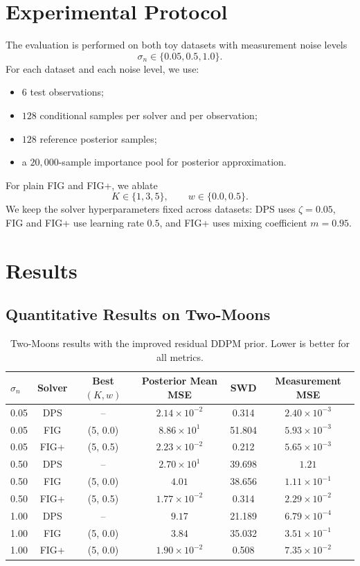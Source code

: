 \documentclass[10pt,twocolumn]{article}
\begin{document}
\section{Experimental Protocol}

The evaluation is performed on both toy datasets with measurement noise levels
\[
\sigma_n \in \{0.05, 0.5, 1.0\}.
\]
For each dataset and each noise level, we use:
\begin{itemize}[leftmargin=1.5em]
    \item \(6\) test observations;
    \item \(128\) conditional samples per solver and per observation;
    \item \(128\) reference posterior samples;
    \item a \(20{,}000\)-sample importance pool for posterior approximation.
\end{itemize}

For plain FIG and FIG+, we ablate
\[
K \in \{1,3,5\},
\qquad
w \in \{0.0, 0.5\}.
\]
We keep the solver hyperparameters fixed across datasets: DPS uses \(\zeta=0.05\), FIG and FIG+ use learning rate \(0.5\), and FIG+ uses mixing coefficient \(m=0.95\).

\section{Results}

\subsection{Quantitative Results on Two-Moons}

\begin{table}[t]
\centering
\small
\caption{Two-Moons results with the improved residual DDPM prior. Lower is better for all metrics.}
\begin{tabular}{lccccc}
\toprule
\(\sigma_n\) & Solver & Best \((K,w)\) & Posterior Mean MSE & SWD & Measurement MSE \\
\midrule
0.05 & DPS & -- & \(2.14\times 10^{-2}\) & 0.314 & \(2.40\times 10^{-3}\) \\
0.05 & FIG & (5, 0.0) & \(8.86\times 10^{1}\) & 51.804 & \(5.93\times 10^{-3}\) \\
0.05 & FIG+ & (5, 0.5) & \(2.23\times 10^{-2}\) & 0.212 & \(5.65\times 10^{-3}\) \\
\midrule
0.50 & DPS & -- & \(2.70\times 10^{1}\) & 39.698 & \(1.21\) \\
0.50 & FIG & (5, 0.0) & \(4.01\) & 38.656 & \(1.11\times 10^{-1}\) \\
0.50 & FIG+ & (5, 0.5) & \(1.77\times 10^{-2}\) & 0.314 & \(2.29\times 10^{-2}\) \\
\midrule
1.00 & DPS & -- & \(9.17\) & 21.189 & \(6.79\times 10^{-4}\) \\
1.00 & FIG & (5, 0.0) & \(3.84\) & 35.032 & \(3.51\times 10^{-1}\) \\
1.00 & FIG+ & (5, 0.0) & \(1.90\times 10^{-2}\) & 0.508 & \(7.35\times 10^{-2}\) \\
\bottomrule
\end{tabular}
\label{tab:two_moons}
\end{table}
\end{document}
